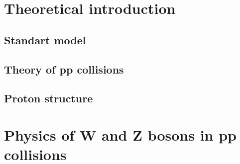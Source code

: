 \chapter{Theoretical introduction}
\section{Standart model}
\section{Theory of pp collisions}
\section{Proton structure}

\chapter{Physics of W and Z bosons in pp collisions}
